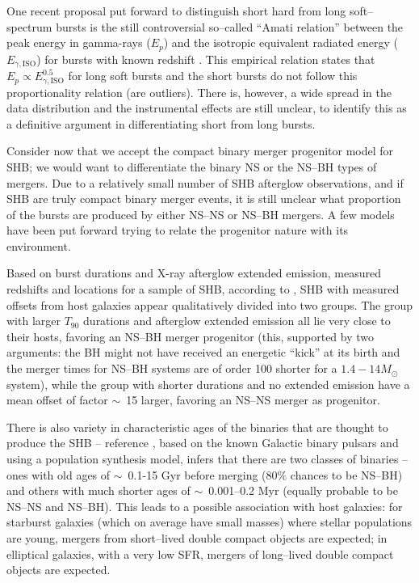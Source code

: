One recent proposal put forward to distinguish short hard from long soft--spectrum bursts is the still controversial so--called ``Amati relation'' between the peak energy in gamma-rays ($E_p$) and the isotropic equivalent radiated energy ($E_{\gamma, \mathrm{ISO}}$) for bursts with known redshift \cite{Amati:2002ny}. This empirical relation states that $E_p \propto E_{\gamma, \mathrm{ISO}}^{0.5}$ for long soft bursts and the short bursts do not follow this proportionality relation (are outliers). There is, however, a wide spread in the data distribution and the instrumental effects are still unclear, to identify this as a definitive argument in differentiating short from long bursts.

Consider now that we accept the compact binary merger progenitor model for SHB; we would want to differentiate the binary NS or the NS--BH types of mergers. Due to a relatively small number of SHB afterglow observations, and if SHB are truly compact binary merger events, it is still unclear what proportion of the bursts are produced by either NS--NS or NS--BH mergers. A few models have been put forward trying to relate the progenitor nature with its environment.

Based on burst durations and X-ray afterglow extended emission, measured redshifts and locations for a sample of SHB, according to \cite{Troja:2007kt}, SHB with measured offsets from host galaxies appear qualitatively divided into two groups. The group with larger $T_{90}$ durations and afterglow extended emission all lie very close to their hosts, favoring an NS--BH merger progenitor (this, supported by two arguments: the BH might not have received an energetic ``kick'' at its birth \cite{Mirabel:2003st} and the merger times for NS--BH systems are of order 100 shorter for a $1.4 - 14 M_{\odot}$ system), while the group with shorter durations and no extended emission have a mean offset of factor $\sim$~15 larger, favoring an NS--NS merger as progenitor. 

There is also variety in characteristic ages of the binaries that are thought to produce the SHB -- reference \cite{Belczynski:2006br}, based on the known Galactic binary pulsars and using a population synthesis model, infers that there are two classes of binaries -- ones with old ages of $\sim$~0.1-15 Gyr before merging (80$\%$ chances to be NS--BH) and others with much shorter ages of $\sim$~0.001--0.2 Myr (equally probable to be NS--NS and NS--BH). This leads to a possible association with host galaxies: for starburst galaxies (which on average have small masses) where stellar populations are young, mergers from short--lived double compact objects are expected; in elliptical galaxies, with a very low SFR, mergers of long--lived double compact objects are expected.

